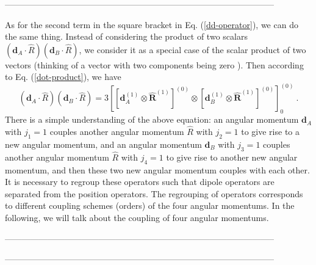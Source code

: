 -----------------------------------------------------------------------------------------------

As for the second term in the square bracket in Eq. (\ref{dd-operator}), we can do the same thing. Instead of considering the product of two scalars $(\mathbf{d}_{A}\cdot\hat{R})(\mathbf{d}_{B}\cdot\hat{R})$, we consider it as a special case of the scalar product of two vectors (thinking of a vector with two components being zero ). Then according to Eq. (\ref{dot-product}), we have
\begin{equation}
(\mathbf{d}_{A}\cdot\hat{R})(\mathbf{d}_{B}\cdot\hat{R})= 3\left[ \left[ \mathbf{d}_{A}^{(1)} \otimes \mathbf{\hat{R}}^{(1)} \right]^{(0)}\otimes \left[ \mathbf{d}_{B}^{(1)} \otimes \mathbf{\hat{R}}^{(1)} \right]^{(0)}  \right]_{0}^{(0)}  \ .
\end{equation}
There is a simple understanding of the above equation: an angular momentum $\mathbf{d}_{A}$ with $j_{1}=1$ couples  another angular momentum $\hat{R}$ with $j_{2}=1$ to give rise to a new angular momentum, and an angular momentum $\mathbf{d}_{B}$ with $j_{3}=1$ couples  another angular momentum $\hat{R}$ with $j_{4}=1$ to give rise to another new angular momentum, and then these two new angular momentum couples with each other. It is necessary to regroup these operators such that dipole operators are separated from the position operators. The regrouping of operators corresponds to different coupling schemes (orders) of the four angular momentums. In the following, we will talk about the coupling of four angular momentums.

-----------------------------------------------------------------------------------------------



-----------------------------------------------------------------------------------------------


